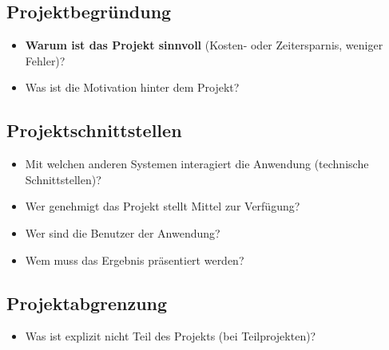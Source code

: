 \subsection{Projektbegründung} 
\label{sec:Projektbegruendung}
\begin{itemize}
	\item \textbf{Warum ist das Projekt sinnvoll} (\zB Kosten- oder Zeitersparnis, weniger Fehler)?
	\item Was ist die Motivation hinter dem Projekt?
\end{itemize}


\subsection{Projektschnittstellen} 
\label{sec:Projektschnittstellen}
\begin{itemize}
	\item Mit welchen anderen Systemen interagiert die Anwendung (technische Schnittstellen)?
	\item Wer genehmigt das Projekt \bzw stellt Mittel zur Verfügung? 
	\item Wer sind die Benutzer der Anwendung?
	\item Wem muss das Ergebnis präsentiert werden?
\end{itemize}


\subsection{Projektabgrenzung} 
\label{sec:Projektabgrenzung}
\begin{itemize}
	\item Was ist explizit nicht Teil des Projekts (\insb bei Teilprojekten)?
\end{itemize}
